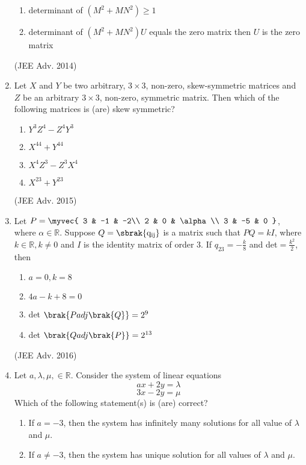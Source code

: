 \begin{enumerate}
\begin{enumerate}
                \item determinant of $(M^2 + MN^2) \geq 1$
                \item determinant of $(M^2 + MN^2)U$ equals the zero matrix then $U$ is the zero matrix
            \end{enumerate}
            \hfill (JEE Adv. 2014)
    \item
        Let $X$ and $Y$ be two arbitrary, $3 \times 3$, non-zero, skew-symmetric matrices and $Z$ be an arbitrary $3 \times 3$, non-zero, symmetric matrix. Then which of the following matrices is (are) skew symmetric?
        \begin{enumerate}
            \item $Y^3Z^4 -Z^4Y^3$
            \item $X^{44} + Y^{44}$
            \item $X^4Z^3 -Z^3X^4$
            \item $X^{23} + Y^{23}$
        \end{enumerate}
        \hfill (JEE Adv. 2015)
    \item 
        Let $P = 
            \myvec{		
                3 & -1 & -2\\
                2 & 0 & \alpha\\
                3 & -5 & 0
            }$,
        where $\alpha \in \mathbb{R}$. Suppose $Q= \mathrm{\sbrak{q_{ij}}}$ is a matrix such that $PQ=kI$, where $k \in \mathbb{R}, k \neq 0$ and $I$ is the identity matrix of order $3$. If $q_{23} = -\frac{k}{8}$ and det$= \frac{k^2}{2}$, then
        \begin{enumerate}
            \item $a=0, k=8$
            \item $4a-k+8=0$
            \item det $\brak{P adj \brak{Q}} = 2^9$
            \item det $\brak{Q adj \brak{P}} = 2^{13}$
        \end{enumerate}
        \hfill (JEE Adv. 2016)
    \item
        Let $a, \lambda, \mu, \in \mathbb{R}$. Consider the system of linear equations $$ax+2y=\lambda$$ $$3x-2y=\mu$$ Which of the following statement(s) is (are) correct?
        \begin{enumerate}
            \item If $a=-3$, then the system has infinitely many solutions for all value of $\lambda$ and $\mu$.
            \item If $a \neq -3$, then the system has unique solution for all values of $\lambda$ and $\mu$.

\end{enumerate}
\end{enumerate}
